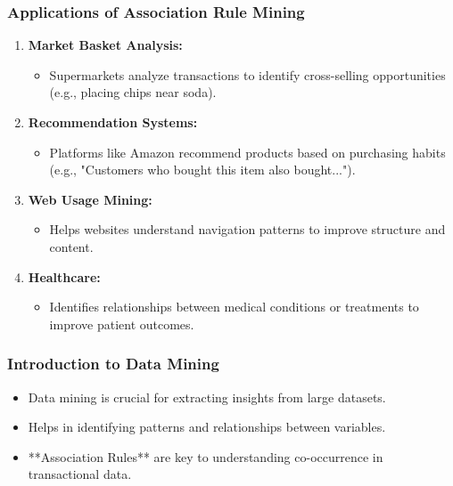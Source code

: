 \documentclass[aspectratio=169]{beamer}
\begin{document}
\begin{frame}[fragile]
    \frametitle{Applications of Association Rule Mining}
    \begin{enumerate}
        \item \textbf{Market Basket Analysis:}
        \begin{itemize}
            \item Supermarkets analyze transactions to identify cross-selling opportunities (e.g., placing chips near soda).
        \end{itemize}
        
        \item \textbf{Recommendation Systems:}
        \begin{itemize}
            \item Platforms like Amazon recommend products based on purchasing habits (e.g., "Customers who bought this item also bought...").
        \end{itemize}
        
        \item \textbf{Web Usage Mining:}
        \begin{itemize}
            \item Helps websites understand navigation patterns to improve structure and content.
        \end{itemize}
        
        \item \textbf{Healthcare:}
        \begin{itemize}
            \item Identifies relationships between medical conditions or treatments to improve patient outcomes.
        \end{itemize}
    \end{enumerate}
\end{frame}

\begin{frame}[fragile]
    \frametitle{Introduction to Data Mining}
    \begin{itemize}
        \item Data mining is crucial for extracting insights from large datasets.
        \item Helps in identifying patterns and relationships between variables.
        \item **Association Rules** are key to understanding co-occurrence in transactional data.
    \end{itemize}
\end{frame}
\end{document}
